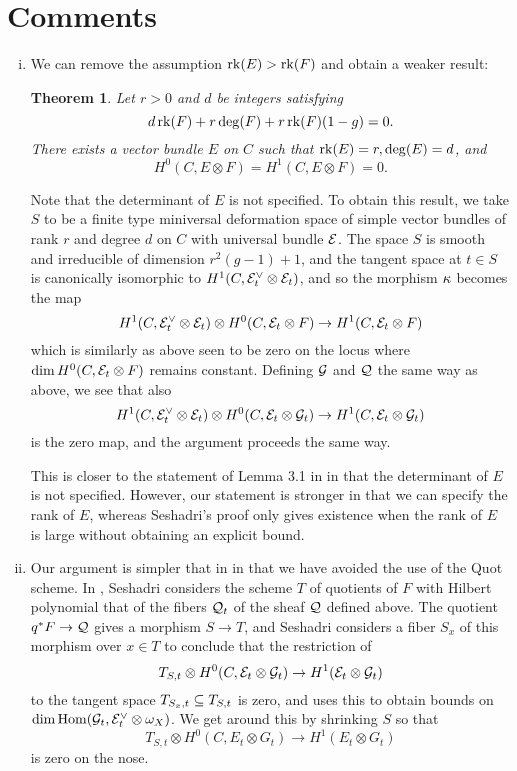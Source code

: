 \documentclass[letterpaper,10pt]{article}
\newtheorem{thm}{Theorem}[section]
\theoremstyle{remark}
\begin{document}
\section{Comments}
\begin{enumerate}[(i)]
    \item We can remove the assumption $\operatorname{\mathrm{rk}}(E) > \operatorname{\mathrm{rk}}(F)$ and obtain a weaker result: 
    \begin{thm}
        Let $r > 0$ and $d$ be integers satisfying
        \[ d \operatorname{\mathrm{rk}}(F) + r \deg(F) + r \operatorname{\mathrm{rk}}(F) (1-g) = 0. \]
        There exists a vector bundle $E$ on $C$ such that $\operatorname{\mathrm{rk}}(E) = r, \deg(E) = d$, and 
        \[ H^0(C, E \otimes F) = H^1(C, E \otimes F) = 0. \]
    \end{thm}
    Note that the determinant of $E$ is not specified. To obtain this result, we take $S$ to be a finite type miniversal deformation space of simple vector bundles of rank $r$ and degree $d$ on $C$ with universal bundle $\mathcal{E}$. The space $S$ is smooth and irreducible of dimension $r^2(g-1)+1$, and the tangent space at $t \in S$ is canonically isomorphic to $H^1(C, \mathcal{E}_t^\vee \otimes \mathcal{E}_t)$, and so the morphism $\kappa$ becomes the map
    \[ H^1(C, \mathcal{E}_t^\vee \otimes \mathcal{E}_t) \otimes H^0(C, \mathcal{E}_t \otimes F) \to H^1(C, \mathcal{E}_t \otimes F) \]
    which is similarly as above seen to be zero on the locus where $\dim H^0(C, \mathcal{E}_t \otimes F)$ remains constant. Defining $\mathcal{G}$ and $\mathcal{Q}$ the same way as above, we see that also
    \[ H^1(C, \mathcal{E}_t^\vee \otimes \mathcal{E}_t) \otimes H^0(C, \mathcal{E}_t \otimes \mathcal{G}_t) \to H^1(C, \mathcal{E}_t \otimes \mathcal{G}_t) \]
    is the zero map, and the argument proceeds the same way. 
    
    This is closer to the statement of Lemma 3.1 in \cite{seshadri} in that the determinant of $E$ is not specified. However, our statement is stronger in that we can specify the rank of $E$, whereas Seshadri's proof only gives existence when the rank of $E$ is large without obtaining an explicit bound.
 
    \item Our argument is simpler that in \cite{seshadri} in that we have avoided the use of the Quot scheme. In \cite{seshadri}, Seshadri considers the scheme $T$ of quotients of $F$ with Hilbert polynomial that of the fibers $\mathcal{Q}_t$ of the sheaf $\mathcal{Q}$ defined above. The quotient $q^*F \to \mathcal{Q}$ gives a morphism $S \to T$, and Seshadri considers a fiber $S_x$ of this morphism over $x \in T$ to conclude that the restriction of 
    \[ T_{S,t} \otimes H^0(C, \mathcal{E}_t \otimes \mathcal{G}_t) \to H^1(\mathcal{E}_t \otimes \mathcal{G}_t) \]
    to the tangent space $T_{S_x, t} \subseteq T_{S,t}$ is zero, and uses this to obtain bounds on $\dim \mathrm{Hom}(\mathcal{G}_t, \mathcal{E}_t^\vee \otimes \omega_X)$. We get around this by shrinking $S$ so that 
    \[ T_{S,t} \otimes H^0(C, E_t \otimes G_t) \to H^1(E_t \otimes G_t) \]
    is zero on the nose.
    

\end{enumerate}
\end{document}
